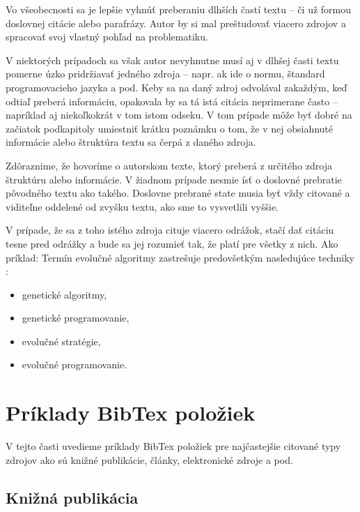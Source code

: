 Vo všeobecnosti sa je lepšie vyhnúť preberaniu dlhších častí textu -- či už formou doslovnej citácie alebo parafrázy. Autor by si mal preštudovať viacero zdrojov a spracovať svoj vlastný pohľad na problematiku.

V niektorých prípadoch sa však autor nevyhnutne musí aj v dlhšej časti textu pomerne úzko pridržiavať jedného zdroja -- napr. ak ide o normu, štandard programovacieho jazyka a pod. Keby sa na daný zdroj odvolával zakaždým, keď odtiaľ preberá informáciu, opakovala by sa tá istá citácia neprimerane často -- napríklad aj niekoľkokrát v tom istom odseku. V tom prípade môže byť dobré na začiatok podkapitoly umiestniť krátku poznámku o tom, že v nej obsiahnuté informácie alebo štruktúra textu sa čerpá z daného zdroja.

Zdôraznime, že hovoríme o autorskom texte, ktorý preberá z určitého zdroja štruktúru alebo informácie. V žiadnom prípade nesmie ísť o doslovné prebratie pôvodného textu ako takého. Doslovne prebrané state musia byť vždy citované a viditeľne oddelené od zvyšku textu, ako sme to vysvetlili vyššie.

V prípade, že sa z toho istého zdroja cituje viacero odrážok, stačí dať citáciu tesne pred odrážky a bude sa jej rozumieť tak, že platí pre všetky z nich. Ako príklad: Termín evolučné algoritmy zastrešuje predovšetkým nasledujúce techniky \cite{Hynek2008}:
\begin{itemize}
\item genetické algoritmy,
\item genetické programovanie,
\item evolučné stratégie,
\item evolučné programovanie.
\end{itemize}

\section{Príklady BibTex položiek}

V tejto časti uvedieme príklady BibTex položiek pre najčastejšie citované typy zdrojov ako sú knižné publikácie, články, elektronické zdroje a pod.

\subsection{Knižná publikácia}

